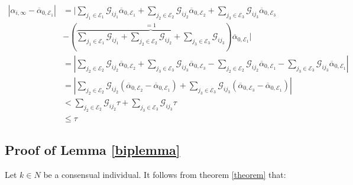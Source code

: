 \documentclass{article}
\begin{document}
\begin{enumerate}
\begin{align*}
|\alpha_{i,\infty} - \overline{\alpha}_{0,{\mathcal{E}_1}} | & = |\sum_{j_1 \in \mathcal{E}_1} \mathcal{G}_{ij_1} \overline{\alpha}_{0,{\mathcal{E}_1}} + \sum_{j_2 \in \mathcal{E}_2} \mathcal{G}_{ij_2} \overline{\alpha}_{0,{\mathcal{E}_2}} + \sum_{j_3 \in \mathcal{E}_3} \mathcal{G}_{ij_3} \overline{\alpha}_{0,{\mathcal{E}_3}} \\ & - (\overbrace{\sum_{j_1 \in \mathcal{E}_1} \mathcal{G}_{ij_1} + \sum_{j_2 \in \mathcal{E}_2} \mathcal{G}_{ij_2} +  \sum_{j_3 \in \mathcal{E}_3} \mathcal{G}_{ij_3} }^{=1}) \overline{\alpha}_{0,{\mathcal{E}_1}}  | \\
& = | \sum_{j_2 \in \mathcal{E}_2} \mathcal{G}_{ij_2} \overline{\alpha}_{0,{\mathcal{E}_2}} + \sum_{j_3 \in \mathcal{E}_3} \mathcal{G}_{ij_3} \overline{\alpha}_{0,{\mathcal{E}_3}} -  \sum_{j_2 \in \mathcal{E}_2} \mathcal{G}_{ij_2} \overline{\alpha}_{0,{\mathcal{E}_1}} -  \sum_{j_3 \in \mathcal{E}_3} \mathcal{G}_{ij_3}  \overline{\alpha}_{0,{\mathcal{E}_1}}  | \\
& = | \sum_{j_2 \in \mathcal{E}_2} \mathcal{G}_{ij_2} (\overline{\alpha}_{0,{\mathcal{E}_2}} - \overline{\alpha}_{0,{\mathcal{E}_1}})  + \sum_{j_3 \in \mathcal{E}_3} \mathcal{G}_{ij_3} (\overline{\alpha}_{0,{\mathcal{E}_3}} - \overline{\alpha}_{0,{\mathcal{E}_1}})   | \\
& <   \sum_{j_2 \in \mathcal{E}_2} \mathcal{G}_{ij_2} \tau  + \sum_{j_3 \in \mathcal{E}_3} \mathcal{G}_{ij_3} \tau    \\
& \leq \tau
\end{align*}
\end{enumerate}





\subsection{Proof of Lemma \ref{biplemma}} \label{proofbiplemma}

\noindent Let $k \in N$ be a consensual individual. It follows from theorem \ref{theorem} that:
\end{document}
